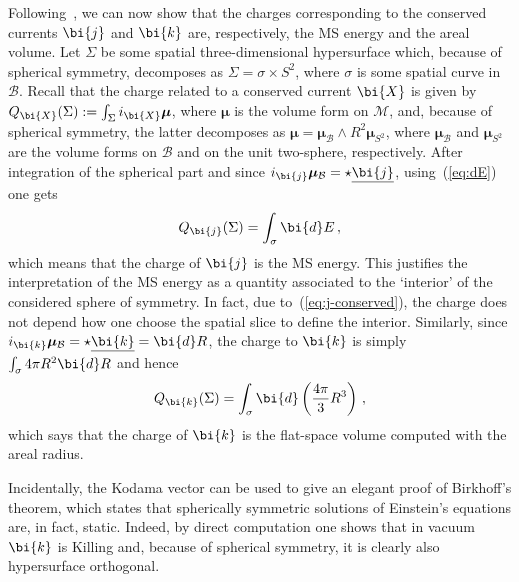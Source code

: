 \documentclass
[rmp,aps,twocolumn,showpacs,preprintnumbers,amsmath,amssymb]{revtex4}
\theoremstyle{plain}
\theoremstyle{definition}
\theoremstyle{remark}
\newcommand{\ul}[1]{\underline{#1}}
\newcommand{\ed}{\bi{d}}                      %
\newcommand{\M}{\mathcal{M}}                      %
\newcommand{\B}{\mathcal{B}}                      %
\newcommand{\Stwo}{{S^2}}                         %
\newcommand{\bj}{\bi{j}}
\newcommand{\bk}{\bi{k}}
\newcommand{\bX}{\bi{X}}
\newcommand{\bmu}{\boldsymbol{\mu}}
\begin{document}
Following~\cite{Hayward:1996}, we can now show that the charges corresponding
to the conserved currents $\bj$ and $\bk$ are, respectively, the MS energy and 
the areal volume. Let $\Sigma$ be some spatial three-dimensional 
hypersurface which, because of spherical symmetry, decomposes as 
$\Sigma=\sigma\times\Stwo$, where $\sigma$ is some spatial curve in $\B$. 
Recall that the charge related to a conserved current $\bX$ is given by 
$Q_\bX(\Sigma):=\int_\Sigma i_\bX\bmu$, where $\bmu$ is the volume 
form on $\M$, and, because of spherical symmetry, the latter decomposes as 
$\bmu=\bmu_\B\wedge R^2\bmu_\Stwo$, where $\bmu_\B$ and $\bmu_\Stwo$ are the
volume forms on $\B$ and on the unit two-sphere, respectively. 
After integration of the spherical part and since $i_\bj\bmu_\B=\star\ul\bj$, 
using~(\ref{eq:dE}) one gets
%
\begin{equation}\label{eq:j-charge}
  Q_\bj(\Sigma) = \int_\sigma \ed E\,,
\end{equation}
%
which means that the charge of $\bj$ is the MS energy. 
This justifies the interpretation of the MS energy as a quantity associated 
to the `interior' of the considered sphere of symmetry. In fact, 
due to~(\ref{eq:j-conserved}), the charge does not depend how one 
choose the spatial slice to define the interior. Similarly, since 
$i_\bk\bmu_\B=\star\ul\bk=\ed R$, the charge to $\bk$ is simply 
$\int_\sigma 4\pi R^2 \ed R$ and hence
%
\begin{equation}\label{eq:Kodama-charge}
  Q_\bk(\Sigma) = \int_\sigma \ed \left( \frac{4\pi}{3}R^3 \right)\,,
\end{equation}
%
which says that the charge of $\bk$ is the flat-space volume 
computed with the areal radius. 

Incidentally, the Kodama vector can be used to give an elegant 
proof of Birkhoff's theorem, which states that spherically symmetric 
solutions of Einstein's equations are, in fact, static. Indeed, by 
direct computation one shows that in vacuum $\bk$ is Killing and, 
because of spherical symmetry, it is clearly also hypersurface 
orthogonal. 
\end{document}

